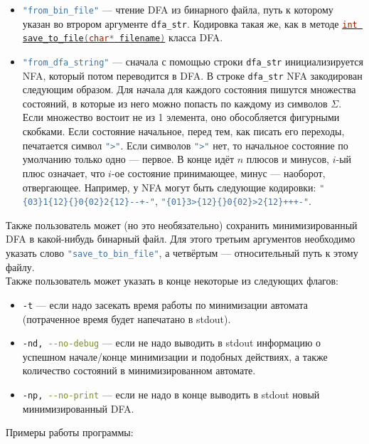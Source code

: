 \documentclass{article}
\begin{document}
\begin{itemize}
  \item[\ding{82}] \lstinline[language=bash]!"from_bin_file"! --- чтение DFA из бинарного файла, путь к которому указан во втрором аргументе \lstinline[language=C++]!dfa_str!. Кодировка такая же, как в методе \hyperlink{p2}{\lstinline[language=C++]!int save_to_file(char* filename)!} класса DFA.
  \item[\ding{82}] \lstinline[language=bash]!"from_dfa_string"! --- сначала с помощью строки \lstinline[language=bash]!dfa_str! инициализируется NFA, который потом переводится в DFA. В строке \lstinline[language=bash]!dfa_str! NFA закодирован следующим образом. Для начала для каждого состояния пишутся множества состояний, в которые из него можно попасть по каждому из символов $\Sigma$. Если множество востоит не из 1 элемента, оно обособляется фигурными скобками. Если состояние начальное, перед тем, как писать его переходы, печатается символ \lstinline[language=bash]!">"!. Если символов \lstinline[language=bash]!">"! нет, то начальное состояние по умолчанию только одно --- первое. В конце идёт $n$ плюсов и минусов, $i$-ый плюс означает, что $i$-ое состояние принимающее, минус --- наоборот, отвергающее. Например, у NFA могут быть следующие кодировки: \lstinline[language=bash]!"{03}1{12}{}0{02}2{12}--+-"!, \lstinline[language=bash]!"{01}3>{12}{}0{02}>2{12}+++-"!.
 \end{itemize}
 Также пользователь может (но это необязательно) сохранить минимизированный DFA в какой-нибудь бинарный файл. Для этого третьим аргументов необходимо указать слово \lstinline[language=bash]!"save_to_bin_file"!, а четвёртым --- относительный путь к этому файлу.\\
 Также пользователь может указать в конце некоторые из следующих флагов:
 \begin{itemize}
  \item[\ding{100}] \lstinline[language=bash]!-t! --- если надо засекать время работы по минимизации автомата (потраченное время будет напечатано в stdout). 
  \item[\ding{100}] \lstinline[language=bash]!-nd, --no-debug! --- если не надо выводить в stdout информацию о успешном начале/конце минимизации и подобных действиях, а также количество состояний в минимизированном автомате. 
  \item[\ding{100}] \lstinline[language=bash]!-np, --no-print! --- если не надо в конце выводить в stdout новый минимизированный DFA. 
\end{itemize}
Примеры работы программы:\\
\end{document}
